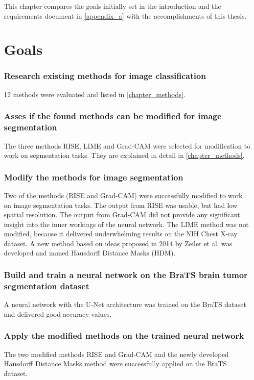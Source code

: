This chapter compares the goals initially set in the introduction and the requirements document in \autoref{appendix_a}  with the accomplishments of this thesis.

\section{Goals}

\subsubsection{Research existing methods for image classification}
12 methods were evaluated and listed in \autoref{chapter_methods}.

\subsubsection{Asses if the found methods can be modified for image segmentation}
The three methods RISE, LIME and Grad-CAM were selected for modification to work on segmentation tasks. They are explained in detail in \autoref{chapter_methods}.

\subsubsection{Modify the methods for image segmentation}
Two of the methods (RISE and Grad-CAM) were successfully modified to work on image segmentation tasks. The output from RISE was usable, but had low spatial resolution. The output from Grad-CAM did not provide any significant insight into the inner workings of the neural network.  The LIME method was not modified, because it delivered underwhelming results on the NIH Chest X-ray dataset. A new method based on ideas proposed in 2014 by Zeiler et al. \cite{zeiler2014visualizing} was developed and named Hausdorff Distance Masks (HDM).

\subsubsection{Build and train a neural network on the BraTS brain tumor segmentation dataset}
A neural network with the U-Net architecture was trained on the BraTS dataset and delivered good accuracy values.

\subsubsection{Apply the modified methods on the trained neural network}
The two modified methods RISE and Grad-CAM and the newly developed Hausdorff Distance Masks method were successfully applied on the BraTS dataset.

